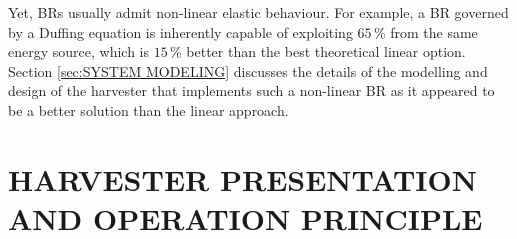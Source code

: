 \documentclass[3p,twocolumn,preprint]{elsarticle}
\begin{document}
Yet, BRs usually admit non-linear elastic behaviour. For example, a BR governed by a Duffing equation is inherently capable of exploiting $65$\,\% from the same energy source, which is $15$\,\% better than the best theoretical linear option. Section \ref{sec:SYSTEM MODELING} discusses the details of the modelling and design of the harvester that implements such a non-linear BR as it appeared to be a better solution than the linear approach. 




\section{HARVESTER PRESENTATION AND OPERATION \mbox{PRINCIPLE}}
\label{sec:HARVESTER PRESENTATION AND OPERATION PRINCIPLE}
\end{document}
